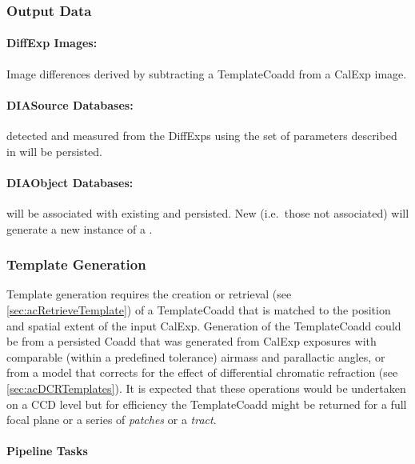 \subsubsection{Output Data}
\label{sec:apAGOutput}

\paragraph*{DiffExp Images:} Image differences derived by subtracting a TemplateCoadd from a CalExp image.

\paragraph*{DIASource Databases:} \DIASources detected and measured from the DiffExps using the set of parameters described in \DPDD will be persisted.


\paragraph*{DIAObject Databases:} \DIASource will be associated with existing \DIAObjects and persisted. New \DIASource (i.e.\ those not associated) will generate a new instance of a \DIAObject.


\subsubsection{Template Generation}
\label{sec:apCRTemplates}

Template generation requires the creation or retrieval (see \ref{sec:acRetrieveTemplate}) of a TemplateCoadd that is matched to the position and spatial extent of the input CalExp. Generation of the TemplateCoadd could be from a persisted Coadd that was generated from CalExp exposures with comparable (within a predefined tolerance) airmass and parallactic angles, or from a model that corrects for the effect of  differential chromatic refraction (see \ref{sec:acDCRTemplates}). It is expected that these operations would be undertaken on a CCD level but for efficiency the TemplateCoadd might be returned for a full focal plane or a series of \textit{patches}  or a \textit{tract}.


\paragraph{Pipeline Tasks}

